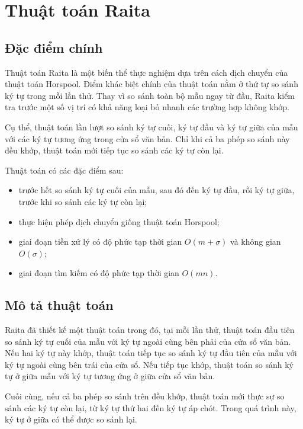 \section{Thuật toán Raita}

\subsection{Đặc điểm chính}

Thuật toán Raita là một biến thể thực nghiệm dựa trên cách dịch chuyển của thuật toán Horspool. Điểm khác biệt chính của thuật toán nằm ở thứ tự so sánh ký tự trong mỗi lần thử. Thay vì so sánh toàn bộ mẫu ngay từ đầu, Raita kiểm tra trước một số vị trí có khả năng loại bỏ nhanh các trường hợp không khớp.

Cụ thể, thuật toán lần lượt so sánh ký tự cuối, ký tự đầu và ký tự giữa của mẫu với các ký tự tương ứng trong cửa sổ văn bản. Chỉ khi cả ba phép so sánh này đều khớp, thuật toán mới tiếp tục so sánh các ký tự còn lại.

Thuật toán có các đặc điểm sau:

\begin{itemize}
    \item trước hết so sánh ký tự cuối của mẫu, sau đó đến ký tự đầu, rồi ký tự giữa, trước khi so sánh các ký tự còn lại;
    \item thực hiện phép dịch chuyển giống thuật toán Horspool;
    \item giai đoạn tiền xử lý có độ phức tạp thời gian \(O(m+\sigma)\) và không gian \(O(\sigma)\);
    \item giai đoạn tìm kiếm có độ phức tạp thời gian \(O(mn)\).
\end{itemize}

\subsection{Mô tả thuật toán}

Raita đã thiết kế một thuật toán trong đó, tại mỗi lần thử, thuật toán đầu tiên so sánh ký tự cuối của mẫu với ký tự ngoài cùng bên phải của cửa sổ văn bản. Nếu hai ký tự này khớp, thuật toán tiếp tục so sánh ký tự đầu tiên của mẫu với ký tự ngoài cùng bên trái của cửa sổ. Nếu tiếp tục khớp, thuật toán so sánh ký tự ở giữa mẫu với ký tự tương ứng ở giữa cửa sổ văn bản.

Cuối cùng, nếu cả ba phép so sánh trên đều khớp, thuật toán mới thực sự so sánh các ký tự còn lại, từ ký tự thứ hai đến ký tự áp chót. Trong quá trình này, ký tự ở giữa có thể được so sánh lại.

